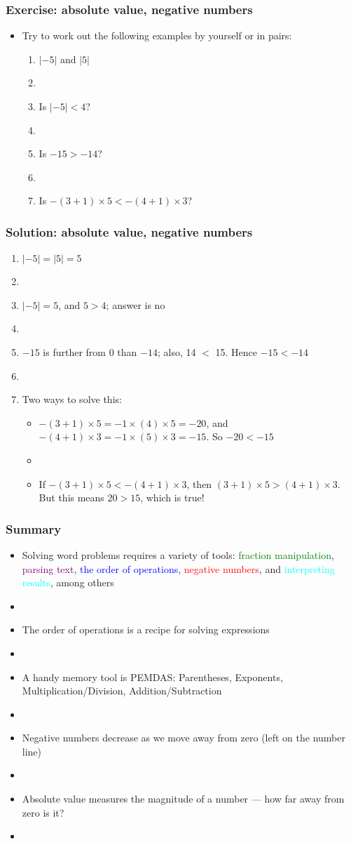 \documentclass[11pt]{beamer}
\newcommand{\myframe}[1]{\begin{frame} \frametitle{#1}}
\begin{document}
\myframe{Exercise: absolute value, negative numbers}
\begin{itemize}
\item Try to work out the following examples by yourself or in pairs:
\begin{enumerate}
\item $|-5|$ and $|5|$
\item[]
\item Is $|-5| < 4$?
\item[]
\item Is $-15 > -14$? 
\item[]
\item Is $-(3 + 1)\times 5 < -(4 + 1)\times 3$?
\end{enumerate}
\end{itemize}
\end{frame}

\myframe{Solution: absolute value, negative numbers}
\begin{enumerate}
\item $|-5| = |5| = 5$
\item[]
\item $|-5| = 5$, and $5 > 4$; answer is no
\item[]
\item $-15$ is further from 0 than $-14$; also, 14 $<$ 15. Hence $-15 < -14$
\item[]
\item Two ways to solve this:
\begin{itemize}
\item $-(3+1)\times 5 = -1\times(4)\times 5 = -20$, and $-(4+1)\times 3 = -1\times (5) \times 3 = -15$. So $-20 < -15$
\item[]
\item If $-(3+1)\times 5 < -(4+1)\times 3$, then $(3+1)\times 5 > (4+1)\times 3$. But this means $20 > 15$, which is true!
\end{itemize}
\end{enumerate}
\end{frame}

\myframe{Summary}
\begin{itemize}
\item Solving word problems requires a variety of tools: \textcolor{green}{fraction manipulation}, \textcolor{purple}{parsing text}, \textcolor{blue}{the order of operations}, \textcolor{red}{negative numbers}, and \textcolor{cyan}{interpreting results}, among others
\item[]
\item The order of operations is a recipe for solving expressions
\item[]
\item A handy memory tool is PEMDAS: Parentheses, Exponents, Multiplication/Division, Addition/Subtraction
\item[]
\item Negative numbers decrease as we move away from zero (left on the number line)
\item[]
\item Absolute value measures the magnitude of a number --- how far away from zero is it?
\item[]
\end{itemize}
\end{frame}
\end{document}
